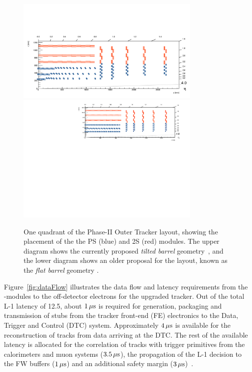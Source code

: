 \begin{figure}[h]
\centering
\includegraphics[width=0.8\textwidth,trim={1.1truecm 0truecm 1truecm 12truecm},clip]{figs/tk-upgrade/tiltedbarrelmap.pdf}
\includegraphics[width=0.8\textwidth,trim={0.7truecm 0truecm 1truecm 0truecm},clip]{figs/tk-upgrade/mersilayout.pdf}
\caption{One quadrant of the Phase-II Outer Tracker layout, showing the placement of the the PS (blue) and 2S (red) modules. The upper diagram shows the currently proposed \emph{tilted barrel} geometry~\cite{tiltedGeometry, P2TrackerTDR}, and the lower diagram shows an older proposal for the layout, known as the \emph{flat barrel} geometry \cite{CMS_Upgrade_TP}.}
\label{fig:trackerlayout}
\end{figure}

Figure~\ref{fig:dataFlow} illustrates the data flow and latency requirements from the \pt-modules to the off-detector electrons for the upgraded tracker.
Out of the total L-1 latency of 12.5\mus, about $1\,\mu\text{s}$ is required for generation, packaging and transmission of stubs from the tracker front-end (FE) electronics to the Data, Trigger and Control (DTC) system. 
Approximately $4\,\mu\text{s}$ is available for the reconstruction of tracks from data arriving at the DTC.
The rest of the available latency is allocated for the correlation of tracks with trigger primitives from the calorimeters and muon systems ($3.5\,\mu\text{s}$), the propagation of the L-1 decision to the FW buffers ($1\,\mu\text{s}$) and an additional safety margin ($3\,\mu\text{s}$)~\cite{TMTT_JINST}.

